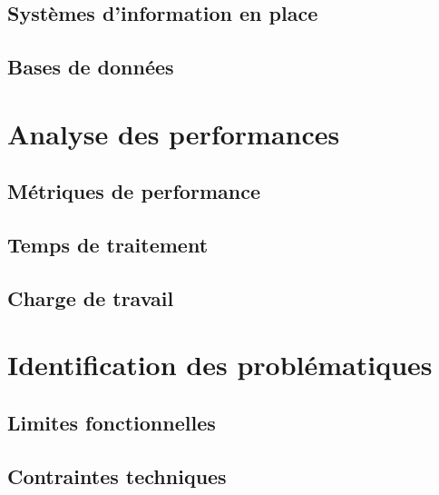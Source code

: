 
\subsection{Systèmes d'information en place}


\subsection{Bases de données}


\section{Analyse des performances}


\subsection{Métriques de performance}


\subsection{Temps de traitement}


\subsection{Charge de travail}


\section{Identification des problématiques}


\subsection{Limites fonctionnelles}


\subsection{Contraintes techniques}

